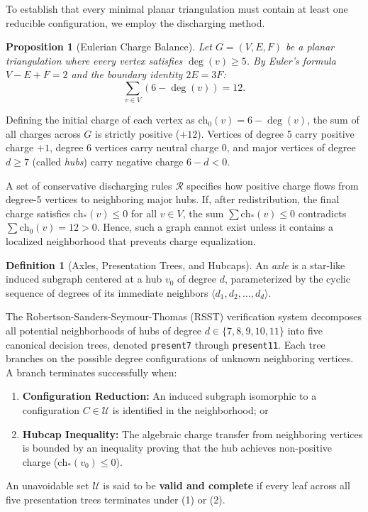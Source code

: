 \documentclass[11pt,a4paper]{article}
\theoremstyle{plain}
\newtheorem{proposition}[theorem]{Proposition}
\theoremstyle{definition}
\newtheorem{definition}[theorem]{Definition}
\begin{document}
To establish that every minimal planar triangulation must contain at least one reducible configuration, we employ the discharging method.

\begin{proposition}[Eulerian Charge Balance]
Let $G = (V, E, F)$ be a planar triangulation where every vertex satisfies $\deg(v) \ge 5$. By Euler's formula $V - E + F = 2$ and the boundary identity $2E = 3F$:
\begin{equation}
\sum_{v \in V} (6 - \deg(v)) = 12.
\end{equation}
\end{proposition}

Defining the initial charge of each vertex as $\text{ch}_0(v) = 6 - \deg(v)$, the sum of all charges across $G$ is strictly positive ($+12$). Vertices of degree 5 carry positive charge $+1$, degree 6 vertices carry neutral charge $0$, and major vertices of degree $d \ge 7$ (called \emph{hubs}) carry negative charge $6 - d < 0$.

A set of conservative discharging rules $\mathcal{R}$ specifies how positive charge flows from degree-5 vertices to neighboring major hubs. If, after redistribution, the final charge satisfies $\text{ch}_*(v) \le 0$ for all $v \in V$, the sum $\sum \text{ch}_*(v) \le 0$ contradicts $\sum \text{ch}_0(v) = 12 > 0$. Hence, such a graph cannot exist unless it contains a localized neighborhood that prevents charge equalization.

\begin{definition}[Axles, Presentation Trees, and Hubcaps]
An \emph{axle} is a star-like induced subgraph centered at a hub $v_0$ of degree $d$, parameterized by the cyclic sequence of degrees of its immediate neighbors $\langle d_1, d_2, \dots, d_d \rangle$.

The Robertson-Sanders-Seymour-Thomas (RSST) verification system decomposes all potential neighborhoods of hubs of degree $d \in \{7, 8, 9, 10, 11\}$ into five canonical decision trees, denoted \texttt{present7} through \texttt{present11}. Each tree branches on the possible degree configurations of unknown neighboring vertices. A branch terminates successfully when:
\begin{enumerate}
    \item \textbf{Configuration Reduction:} An induced subgraph isomorphic to a configuration $C \in \mathcal{U}$ is identified in the neighborhood; or
    \item \textbf{Hubcap Inequality:} The algebraic charge transfer from neighboring vertices is bounded by an inequality proving that the hub achieves non-positive charge ($\text{ch}_*(v_0) \le 0$).
\end{enumerate}
An unavoidable set $\mathcal{U}$ is said to be \textbf{valid and complete} if every leaf across all five presentation trees terminates under (1) or (2).
\end{definition}
\end{document}
